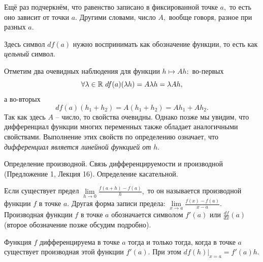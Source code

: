Ещё раз подчеркнём, что
равенство записано в фиксированной точке
$a,$ то есть оно зависит от точки $a.$ Другими словами,
число $A,$ вообще говоря, разное при разных $a.$

Здесь символ $df(a)$ нужно воспринимать как обозначение
функции, то есть как \emph{цельный} символ.

Отметим два очевидных наблюдения для функции $h\mapsto Ah:$
во-первых
$$\forall \lambda\in\mathbb{R} \
    df(a)(\lambda h)=A\lambda h=
    \lambda Ah,
$$
а во-вторых
$$df(a)(h_1+h_2)=A(h_1+h_2)=Ah_1+Ah_2.
$$
Так как здесь $A$ -- число, то свойства очевидны.
Однако позже мы увидим, что дифференциал функции
многих переменных также обладает аналогичными свойствами.
Выполнение этих свойств по определению
означает, что \emph{дифференциал
    является линейной функцией от $h.$}

\newpage
\begin{problem}
Определение производной. Связь дифференцируемости и производной (Предложение
1, Лекция 16). Определение касательной.
\end{problem}

\begin{definition}
    Если существует предел
    $\lim\limits_{h\rightarrow0}\frac{f(a+h)-f(a)}{h},$
    то он называется производной функции $f$ в точке
    $a.$ Другая форма записи предела:
    $\lim\limits_{x\rightarrow a}\frac{f(x)-f(a)}{x-a}.$
    Производная функции $f$ в точке $a$ обозначается
    символом $f'(a)$ или $\frac{df}{dx}(a)$
    (второе обозначение позже обсудим подробно).
\end{definition}

\begin{proposition}
    Функция $f$ дифференцируема в точке $a$
    тогда и только тогда, когда в точке
    $a$ существует производная этой функции $f'(a).$
    При этом $df(h)|_{x=a}=f'(a)h.$
\end{proposition}

